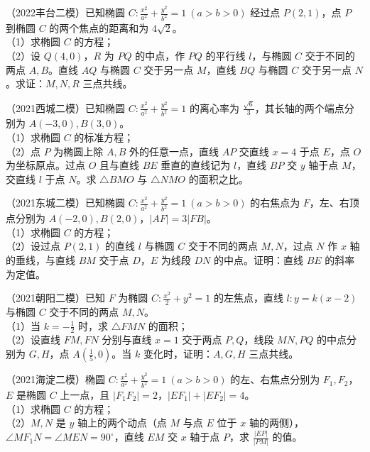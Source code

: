 \begin{example} %
（2022丰台二模）已知椭圆 $C:\frac{x^2}{a^2}+\frac{y^2}{b^2}=1\ (a>b>0)$ 经过点 $P(2,1)$，点 $P$ 到椭圆 $C$ 的两个焦点的距离和为 $4\sqrt{2}$。\\
（1）求椭圆 $C$ 的方程；\\
（2）设 $Q(4,0)$，$R$ 为 $PQ$ 的中点，作 $PQ$ 的平行线 $l$，与椭圆 $C$ 交于不同的两点 $A,B$。直线 $AQ$ 与椭圆 $C$ 交于另一点 $M$，直线 $BQ$ 与椭圆 $C$ 交于另一点 $N$。求证：$M,N,R$ 三点共线。
\end{example}

\begin{example} %
（2021西城二模）已知椭圆 $C:\frac{x^2}{a^2}+\frac{y^2}{b^2}=1$ 的离心率为 $\frac{\sqrt{6}}{3}$，其长轴的两个端点分别为 $A(-3,0),B(3,0)$。\\
（1）求椭圆 $C$ 的标准方程；\\
（2）点 $P$ 为椭圆上除 $A,B$ 外的任意一点，直线 $AP$ 交直线 $x=4$ 于点 $E$，点 $O$ 为坐标原点。过点 $O$ 且与直线 $BE$ 垂直的直线记为 $l$，直线 $BP$ 交 $y$ 轴于点 $M$，交直线 $l$ 于点 $N$。求 $\triangle BMO$ 与 $\triangle NMO$ 的面积之比。
\end{example}

\begin{example} %
（2021东城二模）已知椭圆 $C:\frac{x^2}{a^2}+\frac{y^2}{b^2}=1\ (a>b>0)$ 的右焦点为 $F$，左、右顶点分别为 $A(-2,0),B(2,0)$，$\lvert AF\rvert=3\lvert FB\rvert$。\\
（1）求椭圆 $C$ 的方程；\\
（2）设过点 $P(2,1)$ 的直线 $l$ 与椭圆 $C$ 交于不同的两点 $M,N$，过点 $N$ 作 $x$ 轴的垂线，与直线 $BM$ 交于点 $D$，$E$ 为线段 $DN$ 的中点。证明：直线 $BE$ 的斜率为定值。
\end{example}

\begin{example} %
（2021朝阳二模）已知 $F$ 为椭圆 $C:\frac{x^2}{2}+y^2=1$ 的左焦点，直线 $l:y=k(x-2)$ 与椭圆 $C$ 交于不同的两点 $M,N$。\\
（1）当 $k=-\frac{1}{2}$ 时，求 $\triangle FMN$ 的面积；\\
（2）设直线 $FM,FN$ 分别与直线 $x=1$ 交于两点 $P,Q$，线段 $MN,PQ$ 的中点分别为 $G,H$，点 $A\left(\frac{1}{5},0\right)$。当 $k$ 变化时，证明：$A,G,H$ 三点共线。
\end{example}

\begin{example} %
（2021海淀二模）椭圆 $C:\frac{x^2}{a^2}+\frac{y^2}{b^2}=1\ (a>b>0)$ 的左、右焦点分别为 $F_1,F_2$，$E$ 是椭圆 $C$ 上一点，且 $\lvert F_1F_2\rvert=2$，$\lvert EF_1\rvert+\lvert EF_2\rvert=4$。\\
（1）求椭圆 $C$ 的方程；\\
（2）$M,N$ 是 $y$ 轴上的两个动点（点 $M$ 与点 $E$ 位于 $x$ 轴的两侧），$\angle MF_1N=\angle MEN=90^\circ$，直线 $EM$ 交 $x$ 轴于点 $P$，求 $\frac{\lvert EP\rvert}{\lvert PM\rvert}$ 的值。
\end{example}

